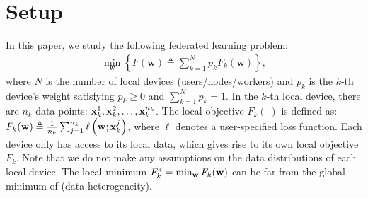 

\section{Setup}


In this paper, we study the following federated learning problem:
\begin{align}
	\min _{\mathbf{w}}\left\{F(\mathbf{w}) \triangleq \sum\nolimits_{k=1}^{N} p_{k} F_{k}(\mathbf{w})\right\},
	\label{eq:problem}
\end{align}
where $N$ is the number of local devices (users/nodes/workers) and $p_k$ is the $k$-th device's weight satisfying $p_k \geq 0$ and $\sum_{k=1}^N p_k = 1$. 
In the $k$-th local device, there are $n_k$ data points:
${\mathbf{x}}_k^1, {\mathbf{x}}_k^2, \dots, {\mathbf{x}}_k^{n_k}$.  
The local objective $F_k(\cdot)$ is defined as:
$F_{k}(\mathbf{w}) \triangleq \frac{1}{n_{k}} \sum_{j=1}^{n_{k}} \ell\left(\mathbf{w} ; {\mathbf{x}}_k^j\right)$,
where $\ell$ denotes a user-specified loss function. Each device only has access to its local data, which gives rise to its own local objective $F_k$. Note that we do not make any assumptions on the
data distributions of each local device. The local minimum
$F^{*}_k= \min_{{\mathbf{w}}} F_k({\mathbf{w}})$ can be far from
the global minimum of \eq{\ref{eq:problem}} (data heterogeneity).



